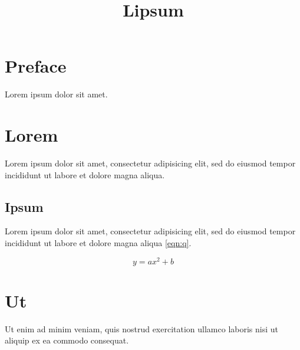 \documentclass[dvipdfmx]{book}
\title{Lipsum}
\begin{document}
\frontmatter

\maketitle

\tableofcontents

\chapter{Preface}
Lorem ipsum dolor sit amet.

\mainmatter

\chapter{Lorem}

Lorem ipsum dolor sit amet, consectetur adipisicing elit, sed do
eiusmod tempor incididunt ut labore et dolore magna aliqua.

\section{Ipsum}

Lorem ipsum dolor sit amet, consectetur adipisicing
elit\cite{Lamport94}, sed do eiusmod tempor incididunt ut labore et
dolore magna aliqua \ref{eqn:q}.

\begin{equation}\label{eqn:q}
y = ax^2 + b
\end{equation}

\appendix

\chapter{Ut}

Ut enim ad minim veniam, quis nostrud exercitation ullamco
laboris nisi ut aliquip ex ea commodo consequat.

\backmatter




\printindex
\end{document}
